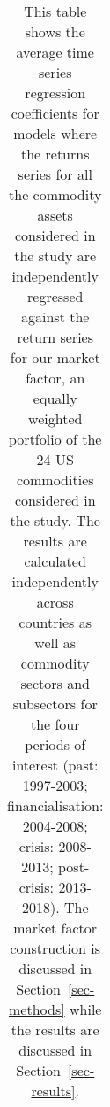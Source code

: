\documentclass[
  authoryear,
  preprint,
  3p]{elsarticle}
\begin{document}
\begin{longtable}[t]{>{}l>{}l>{}l>{}r>{}r>{}r>{}r}

\caption{\label{tbl-regressions-index}This table shows the average time
series regression coefficients for models where the returns series for
all the commodity assets considered in the study are independently
regressed against the return series for our market factor, an equally
weighted portfolio of the 24 US commodities considered in the study. The
results are calculated independently across countries as well as
commodity sectors and subsectors for the four periods of interest (past:
1997-2003; financialisation: 2004-2008; crisis: 2008-2013; post-crisis:
2013-2018). The market factor construction is discussed in
Section~\ref{sec-methods} while the results are discussed in
Section~\ref{sec-results}.}

\tabularnewline


\end{longtable}
\end{document}
